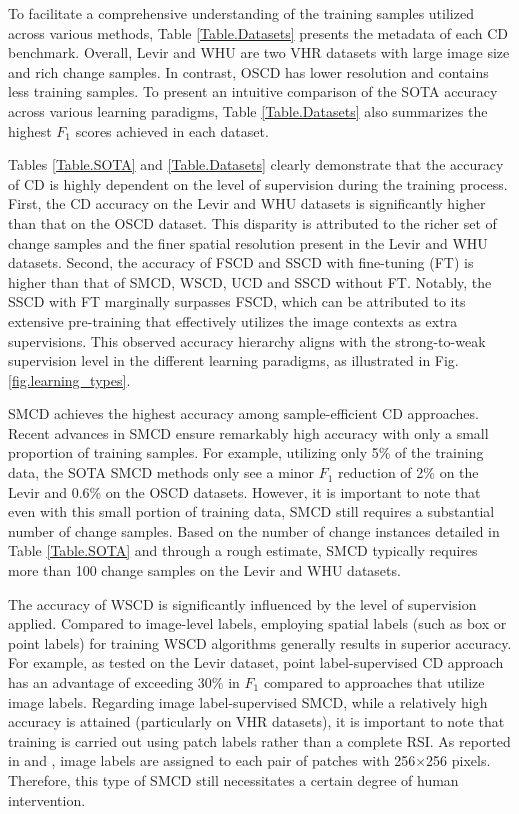 To facilitate a comprehensive understanding of the training samples utilized across various methods, Table \ref{Table.Datasets} presents the metadata of each CD benchmark. Overall, Levir and WHU are two VHR datasets with large image size and rich change samples. In contrast, OSCD has lower resolution and contains less training samples. To present an intuitive comparison of the SOTA accuracy across various learning paradigms, Table \ref{Table.Datasets} also summarizes the highest $F_1$ scores achieved in each dataset.

Tables \ref{Table.SOTA} and \ref{Table.Datasets} clearly demonstrate that the accuracy of CD is highly dependent on the level of supervision during the training process. First, the CD accuracy on the Levir and WHU datasets is significantly higher than that on the OSCD dataset. This disparity is attributed to the richer set of change samples and the finer spatial resolution present in the Levir and WHU datasets. Second, the accuracy of FSCD and SSCD with fine-tuning (FT) is higher than that of SMCD, WSCD, UCD and SSCD without FT. Notably, the SSCD with FT marginally surpasses FSCD, which can be attributed to its extensive pre-training that effectively utilizes the image contexts as extra supervisions. This observed accuracy hierarchy aligns with the strong-to-weak supervision level in the different learning paradigms, as illustrated in Fig.\ref{fig.learning_types}.

SMCD achieves the highest accuracy among sample-efficient CD approaches. Recent advances in SMCD ensure remarkably high accuracy with only a small proportion of training samples. For example, utilizing only 5\% of the training data, the SOTA SMCD methods only see a minor $F_1$ reduction of 2\% on the Levir and 0.6\% on the OSCD datasets. However, it is important to note that even with this small portion of training data, SMCD still requires a substantial number of change samples. Based on the number of change instances detailed in Table \ref{Table.SOTA} and through a rough estimate, SMCD typically requires more than 100 change samples on the Levir and WHU datasets.


The accuracy of WSCD is significantly influenced by the level of supervision applied. Compared to image-level labels, employing spatial labels (such as box or point labels) for training WSCD algorithms generally results in superior accuracy. For example, as tested on the Levir dataset, point label-supervised CD approach \cite{fang2023point} has an advantage of exceeding 30\% in $F_1$ compared to approaches that utilize image labels. Regarding image label-supervised SMCD, while a relatively high accuracy is attained (particularly on VHR datasets), it is important to note that training is carried out using patch labels rather than a complete RSI. As reported in \cite{lu2024weakly} and \cite{dai2023siamese}, image labels are assigned to each pair of patches with 256$\times$256 pixels. Therefore, this type of SMCD still necessitates a certain degree of human intervention.


